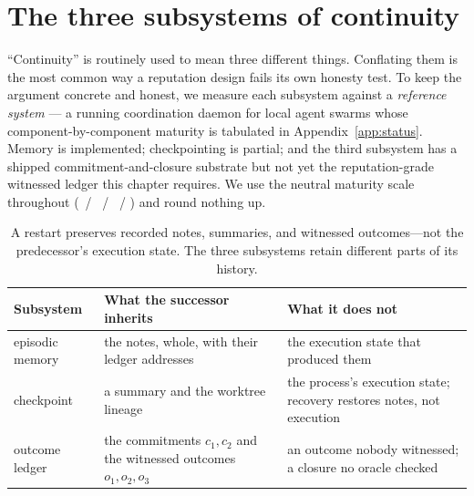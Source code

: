\documentclass[11pt,a4paper]{article}
\theoremstyle{definition}
\begin{document}
\section{The three subsystems of continuity}\label{sec:organs}

``Continuity'' is routinely used to mean three different things. Conflating them
is the most common way a reputation design fails its own honesty test. To keep the
argument concrete and honest, we measure each subsystem against a \emph{reference
system} --- a running coordination daemon for local agent swarms whose component-by-component
maturity is tabulated in Appendix~\ref{app:status}. Memory is implemented;
checkpointing is partial; and the third subsystem has a shipped commitment-and-closure
substrate but not yet the reputation-grade witnessed ledger this chapter requires.
We use the neutral maturity scale throughout (\BUILT~/
\BUILTWEAK~/ \DESIGNED~/ \VISION) and round nothing up.

\begin{table}[H]
\centering
\caption{A restart preserves recorded notes, summaries, and witnessed outcomes---not the predecessor's execution state. The three subsystems retain different parts of its history.}
\label{tab:stp-organs}
\small
\renewcommand{\arraystretch}{1.15}
\begin{tabularx}{\linewidth}{@{}l >{\raggedright\arraybackslash}X >{\raggedright\arraybackslash}X@{}}
\toprule
\textbf{Subsystem} & \textbf{What the successor inherits} & \textbf{What it does not} \\
\midrule
episodic memory & the notes, whole, with their ledger addresses & the execution state that produced them \\
checkpoint & a summary and the worktree lineage & the process's execution state; recovery restores notes, not execution \\
outcome ledger & the commitments $c_1, c_2$ and the witnessed outcomes $o_1, o_2, o_3$ & an outcome nobody witnessed; a closure no oracle checked \\
\bottomrule
\end{tabularx}
\end{table}
\end{document}
